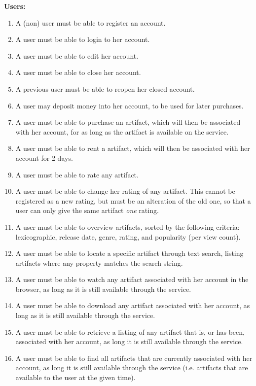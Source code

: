 \textbf{Users:}
\begin{enumerate}
\setcounter{enumi}{\theenumTemp}
\item A (non) user must be able to register an account.
\item A user must be able to login to her account.
\item A user must be able to edit her account.
\item A user must be able to close her account.
\item A previous user must be able to reopen her closed account.
\item A user may deposit money into her account, to be used for later
	purchases.
\item A user must be able to purchase an artifact, which will then be associated
	with her account, for as long as the artifact is available on the
	service.
\item A user must be able to rent a artifact, which will then be associated
	with her account for 2 days.
\item A user must be able to rate any artifact.
\item A user must be able to change her rating of any artifact.
	This cannot be registered as a new rating, but must be an alteration of
	the old one, so that a user can only give the same artifact \emph{one}
	rating.
\item A user must be able to overview artifacts, sorted by the following
	criteria: lexicographic, release date, genre, rating, and
	popularity (per view count).
\item A user must be able to locate a specific artifact through text search,
	listing artifacts where any property matches the search string.
\item A user must be able to watch any artifact associated with her account
	in the browser, as long as it is still available through the service.
\item A user must be able to download any artifact associated with her account,
	as long as it is still available through the service.
\item A user must be able to retrieve a listing of any artifact that is, or has
	been, associated with her account, as long it is still available through
	the service.
\item A user must be able to find all artifacts that are currently associated
	with her account, as long it is still available through the service (i.e.
	artifacts that are available to the user at the given time).
\setcounter{enumTemp}{\theenumi}
\end{enumerate}

